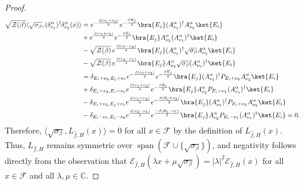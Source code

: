 \documentclass[11pt]{amsart}
\newcommand{\1}{\mathbbm{1}}
\theoremstyle{plain}
\theoremstyle{definition}
\theoremstyle{remark}
\numberwithin{equation}{section}
\begin{document}
\begin{proof}
\begin{align*}
\sqrt{\mathcal{Z}(\beta)}\langle \sqrt{\sigma_\beta},(\delta^\alpha_{\nu_1})^\dagger\delta^\alpha_{\nu_2}(x)\rangle&=e^{-\frac{\beta(\nu_1+\nu_2)}{4}}e^{-\frac{\beta E_j}{2}}\bra{ E_j}(A^\alpha_{\nu_1})^\dagger A^\alpha_{\nu_2}\ket{E_i}\\
&+e^{\frac{\beta(\nu_1+\nu_2)}{4}}e^{-\frac{\beta E_i}{2}}\bra{E_j}A^\alpha_{\nu_2}(A^\alpha_{\nu_1})^\dagger \ket{E_i}\\
&-\sqrt{\mathcal{Z}(\beta)}\,e^{\frac{\beta(\nu_1-\nu_2)}{4}}\bra{E_j}(A^\alpha_{\nu_1})^\dagger \sqrt{\sigma_\beta }A^\alpha_{\nu_2}\ket{E_i}\\
&-\sqrt{\mathcal{Z}(\beta)}\,e^{\frac{\beta(\nu_2-\nu_1)}{4}}\bra{E_j}A^\alpha_{\nu_2}\sqrt{\sigma_\beta}(A^\alpha_{\nu_1})^\dagger\ket{E_i} \\
&=\delta_{E_i+\nu_2,E_j+\nu_1}e^{-\frac{\beta(\nu_1+\nu_2)}{4}}e^{-\frac{\beta E_j}{2}}\bra{E_j}(A^\alpha_{\nu_1})^\dagger P_{E_i+\nu_2}A^\alpha_{\nu_2}\ket{E_i}\\
&+\delta_{E_j-\nu_2,E_i-\nu_1}e^{\frac{\beta(\nu_1+\nu_2)}{4}}e^{-\frac{\beta E_i}{2}}\bra{E_j}A^\alpha_{\nu_2}P_{E_i-\nu_1}(A^\alpha_{\nu_1})^\dagger\ket{E_i}\\
&-\delta_{E_i+\nu_2,E_j+\nu_1}e^{\frac{\beta(\nu_1-\nu_2)}{4}}e^{-\frac{\beta(E_i+\nu_2)}{2}}\bra{E_j}(A^\alpha_{\nu_1})^\dagger P_{E_i+\nu_2}A^\alpha_{\nu_2}\ket{E_i}\\
&-\delta_{E_i-\nu_1,E_j-\nu_2}e^{\frac{\beta(\nu_2-\nu_1)}{4}}e^{\frac{-\beta(E_i-\nu_1)}{2}}\bra{E_j}A^\alpha_{\nu_2}P_{E_i-\nu_1}(A^\alpha_{\nu_1})^\dagger\ket{E_i}=0.
\end{align*}
Therefore, $\langle\sqrt{\sigma_\beta},L_{\widehat{f},H}(x)\rangle=0$ for all $x\in\mathscr{F}$ by the definition of $L_{\widehat{f},H}(x)$. Thus, $L_{\widehat{f},H}$ remains symmetric over $\operatorname{span}(\mathscr{F}\cup\{\sqrt{\sigma_{\beta}}\})$, and negativity follows directly from the observation that $\mathcal{E}_{\widehat{f},H}(\lambda x+\mu\sqrt{\sigma_\beta})=|\lambda|^2\mathcal{E}_{\widehat{f},H}(x)$ for all $x\in\mathscr{F}$ and all $\lambda,\mu\in\mathbb{C}$.
\end{proof}
\end{document}
